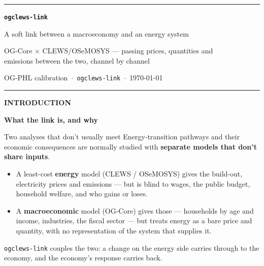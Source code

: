 \documentclass[aspectratio=169,11pt]{beamer}
\newcommand{\kick}[1]{{\scriptsize\bfseries\color{claret}\MakeUppercase{#1}}}
\newcommand{\sectiondiv}[2]{%
  \begin{frame}[plain]\vfill\hspace{0.7cm}\begin{minipage}{0.86\paperwidth}
    {\color{claret}\rule{1.0cm}{2.5pt}}\par\vspace{9pt}
    \kick{#1}\par\vspace{5pt}
    {\rmfamily\bfseries\huge\color{ink}#2}\par
  \end{minipage}\vfill\end{frame}}
\begin{document}
\begin{frame}[plain]
  \vfill\hspace{0.7cm}\begin{minipage}{0.86\paperwidth}
  {\color{claret}\rule{1.3cm}{2.6pt}}\par\vspace{12pt}
  {\rmfamily\bfseries\LARGE\color{ink}\texttt{ogclews-link}}\par\vspace{6pt}
  {\rmfamily\Large\color{ink}A soft link between a macroeconomy and an energy system}\par\vspace{12pt}
  {\large\color{sub}OG-Core $\times$ CLEWS/OSeMOSYS --- passing prices, quantities and\\ emissions between the two, channel by channel}\par\vspace{20pt}
  {\footnotesize\color{mute}OG-PHL calibration\, $\cdot$\, \texttt{ogclews-link}\, $\cdot$\, \today}\par
  \end{minipage}\vfill
\end{frame}

\sectiondiv{Introduction}{What the link is, and why}

\begin{frame}{Two analyses that don't usually meet}
  Energy-transition pathways and their economic consequences are normally studied with
  \textbf{separate models that don't share inputs}.
  \medskip
  \begin{itemize}\setlength\itemsep{8pt}
    \item A least-cost \textbf{energy} model (CLEWS / OSeMOSYS) gives the build-out, electricity
          prices and emissions --- but is blind to wages, the public budget, household welfare,
          and who gains or loses.
    \item A \textbf{macroeconomic} model (OG-Core) gives those --- households by age and income,
          industries, the fiscal sector --- but treats energy as a bare price and quantity, with
          no representation of the system that supplies it.
  \end{itemize}
  \medskip
  {\color{ink}\texttt{ogclews-link} couples the two}: a change on the energy side carries through to
  the economy, and the economy's response carries back.
\end{frame}
\end{document}
